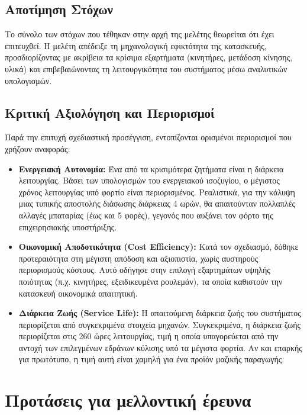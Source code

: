 \subsection{Αποτίμηση Στόχων}
Το σύνολο των στόχων που τέθηκαν στην αρχή της μελέτης θεωρείται ότι έχει επιτευχθεί. Η μελέτη απέδειξε τη μηχανολογική εφικτότητα της κατασκευής, προσδιορίζοντας με ακρίβεια τα κρίσιμα εξαρτήματα (κινητήρες, μετάδοση κίνησης, υλικά) και επιβεβαιώνοντας τη λειτουργικότητα του συστήματος μέσω αναλυτικών υπολογισμών.

\subsection{Κριτική Αξιολόγηση και Περιορισμοί}
Παρά την επιτυχή σχεδιαστική προσέγγιση, εντοπίζονται ορισμένοι περιορισμοί που χρήζουν αναφοράς:

\begin{itemize}
    \item \textbf{Ενεργειακή Αυτονομία:} Ένα από τα κρισιμότερα ζητήματα είναι η διάρκεια λειτουργίας. Βάσει των υπολογισμών του ενεργειακού ισοζυγίου, ο μέγιστος χρόνος λειτουργίας υπό φορτίο είναι περιορισμένος. Ρεαλιστικά, για την κάλυψη μιας τυπικής αποστολής διάσωσης διάρκειας 4 ωρών, θα απαιτούνταν πολλαπλές αλλαγές μπαταρίας (έως και 5 φορές), γεγονός που αυξάνει τον φόρτο της επιχειρησιακής υποστήριξης.
    \item \textbf{Οικονομική Αποδοτικότητα (Cost Efficiency):} Κατά τον σχεδιασμό, δόθηκε προτεραιότητα στη μέγιστη απόδοση και αξιοπιστία, χωρίς αυστηρούς περιορισμούς κόστους. Αυτό οδήγησε στην επιλογή εξαρτημάτων υψηλής ποιότητας (π.χ. κινητήρες, εξειδικευμένα ρουλεμάν), τα οποία καθιστούν την κατασκευή οικονομικά απαιτητική.
    \item \textbf{Διάρκεια Ζωής (Service Life):} Η απαιτούμενη διάρκεια ζωής του συστήματος περιορίζεται από συγκεκριμένα στοιχεία μηχανών. Συγκεκριμένα, η διάρκεια ζωής περιορίζεται στις 260 ώρες λειτουργίας, τιμή η οποία υπαγορεύεται από την αντοχή των επιλεγμένων εδράνων κύλισης υπό τα μέγιστα φορτία. Αν και επαρκής για πρωτότυπο, η τιμή αυτή είναι χαμηλή για ένα προϊόν μαζικής παραγωγής.
\end{itemize}

\section{Προτάσεις για μελλοντική έρευνα}





